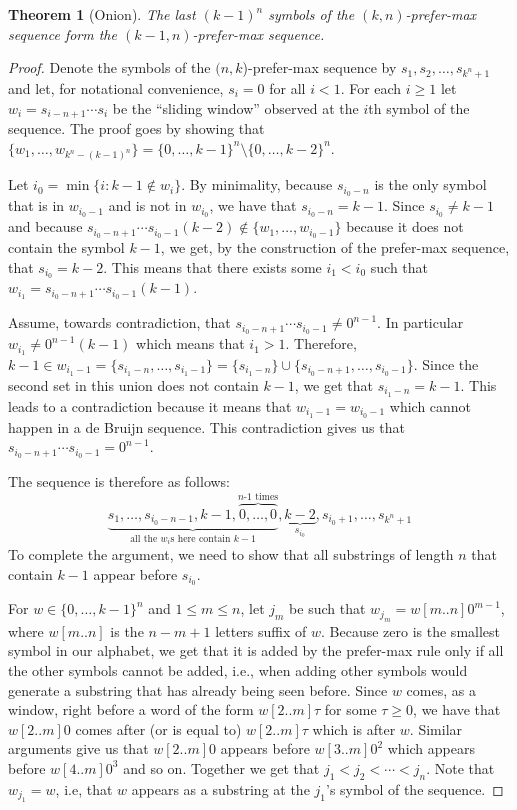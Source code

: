 \documentclass{article}
\newtheorem{reptheorem}{Theorem}
\newenvironment{repeatedtheorem}[1]
{
	\setcounterref{reptheorem}{#1}
	\addtocounter{reptheorem}{-1}
	\begin{reptheorem}
	}{			
	\end{reptheorem}
}
\theoremstyle{definition}
\begin{document}
\begin{repeatedtheorem}{thm:onion}[Onion]
	{The last $(k-1)^n$ symbols of the $(k,n)$-prefer-max sequence form the $(k-1,n)$-prefer-max sequence.}
\end{repeatedtheorem}
\begin{proof}
	Denote the symbols of the $(n,k$)-prefer-max sequence by
	$s_1,s_2,\dots,s_{k^n+1}$ and let, for notational convenience, $s_i=0$ for all
	$i<1$.  For each $i\geq 1$ let $w_i=s_{i-n+1}\cdots s_i$ be the ``sliding window''
	observed at the $i$th symbol of the sequence. 
	The proof goes by showing that $\{w_1,\dots,w_{k^n-(k-1)^n}\} = \{0,\dots,k-1\}^n \setminus \{0,\dots,k-2\}^n$.
	
	Let ${i_0} = \min\{i\colon k-1 \notin w_i\}$. 
	By minimality, because  $s_{{i_0}-n}$ is the only symbol that is in $w_{i_0-1}$ and is not in $w_{i_0}$, 
	we have that $s_{{i_0}-n}=k-1$. Since $s_{i_0} \neq k-1$ and
	because $s_{{i_0}-n+1}\cdots s_{{i_0}-1} (k-2) \notin \{w_1,\dots,w_{i_0-1}\}$ because it does not contain the symbol $k-1$, 
	we get, by the construction of the prefer-max sequence,
	that $s_{{i_0}}=k-2$. This means that there exists some ${i_1}<{i_0}$ such that
	$w_{i_1} = s_{{i_0}-n+1}\cdots s_{{i_0}-1}(k-1)$.
	
	Assume, towards contradiction, that $s_{{i_0}-n+1}\cdots s_{{i_0}-1} \neq
	0^{n-1}$. In particular $w_{i_1} \neq 0^{n-1}(k-1)$ which
	means that ${i_1} > 1$. Therefore, $k-1  \in w_{i_1-1}=
	\{s_{{i_1}-n},\dots,s_{{i_1}-1}\}=\{s_{{i_1}-n}\} \cup
	\{s_{{i_0}-n+1},\dots,s_{{i_0}-1}\}$. Since the second set in this union does
	not contain $k-1$, we get that $s_{{i_1}-n}=k-1$. This leads to a contradiction
	because it means that $w_{{i_1}-1} = w_{{i_0}-1}$ which cannot happen in a de Bruijn sequence. This contradiction
	gives us that $s_{{i_0}-n+1}\cdots s_{{i_0}-1} = 0^{n-1}$.
	
	The sequence is therefore as follows:
	$$\underbrace{s_1,\dots,s_{i_0-n-1},k-1,\overbrace{0,\dots,0}^\text{$n\text{-}1$ times}}_{\text{all the $w_i$s here contain
				$k-1$}},\underbrace{k-2}_{s_{i_0}},s_{i_0+1},\dots,s_{k^n+1}$$
	To complete the argument, we need to show that all substrings of length $n$ that
	contain $k-1$ appear before $s_{i_0}$.
	
	For $w \in \{0,\dots,k-1\}^n$ and $1 \leq m \leq n$, let $j_m$ be such that
	$w_{j_m} = w[m..n]0^{m-1}$, where $w[m..n]$ is the $n-m+1$
	letters suffix of $w$. 
	Because zero is the smallest symbol in our alphabet, we get that it is added by the prefer-max rule
	only if all the other symbols cannot be added, i.e., when adding other symbols
	would generate a substring that has already being seen before. 
	Since $w$ comes, as a window, right before a word of the form $w[2..m]\tau$ for some $\tau \geq 0$,
	we have that $w[2..m]0$ comes after (or is equal to) $w[2..m]\tau$ which is
	after $w$. Similar arguments give us that $w[2..m]0$ appears before $w[3..m]0^2$ which appears before $w[4..m]0^3$ and
	so on. Together we get that $j_1 < j_2 < \cdots < j_n$. Note that $w_{j_1}=w$, 
	i.e, that $w$ appears as a substring at the $j_1$'s symbol of the
	sequence.
	

\end{proof}
\end{document}
